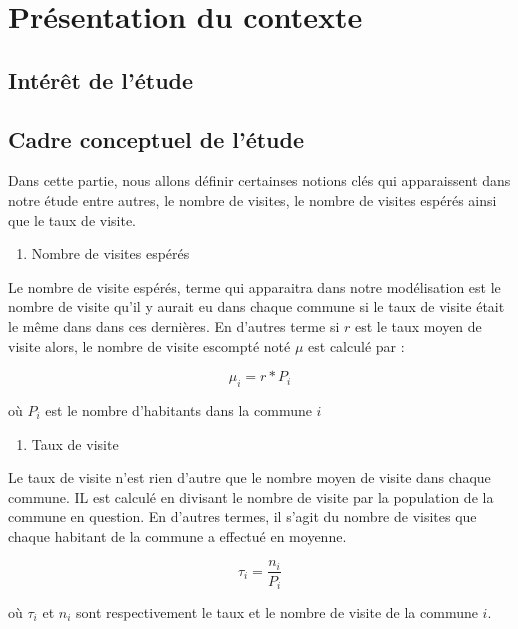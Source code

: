 \documentclass[
]{article}
\author{}
\date{\vspace{-2.5em}}
\providecommand{\tightlist}{%
  \setlength{\itemsep}{0pt}\setlength{\parskip}{0pt}}
\begin{document}
\section{Présentation du contexte}\label{pruxe9sentation-du-contexte}

\subsection{Intérêt de l'étude}\label{intuxe9ruxeat-de-luxe9tude}

\subsection{Cadre conceptuel de
l'étude}\label{cadre-conceptuel-de-luxe9tude}

Dans cette partie, nous allons définir certainses notions clés qui
apparaissent dans notre étude entre autres, le nombre de visites, le
nombre de visites espérés ainsi que le taux de visite.

\begin{enumerate}
\def\labelenumi{\arabic{enumi}.}
\tightlist
\item
  Nombre de visites espérés
\end{enumerate}

Le nombre de visite espérés, terme qui apparaitra dans notre
modélisation est le nombre de visite qu'il y aurait eu dans chaque
commune si le taux de visite était le même dans dans ces dernières. En
d'autres terme si \(r\) est le taux moyen de visite alors, le nombre de
visite escompté noté \(\mu\) est calculé par :

\[ \mu_i = r * P_i\]

où \(P_i\) est le nombre d'habitants dans la commune \(i\)

\begin{enumerate}
\def\labelenumi{\arabic{enumi}.}
\setcounter{enumi}{1}
\tightlist
\item
  Taux de visite
\end{enumerate}

Le taux de visite n'est rien d'autre que le nombre moyen de visite dans
chaque commune. IL est calculé en divisant le nombre de visite par la
population de la commune en question. En d'autres termes, il s'agit du
nombre de visites que chaque habitant de la commune a effectué en
moyenne.

\[\tau_i = \frac{n_i}{P_i}\]

où \(\tau_i\) et \(n_i\) sont respectivement le taux et le nombre de
visite de la commune \(i\).
\end{document}
